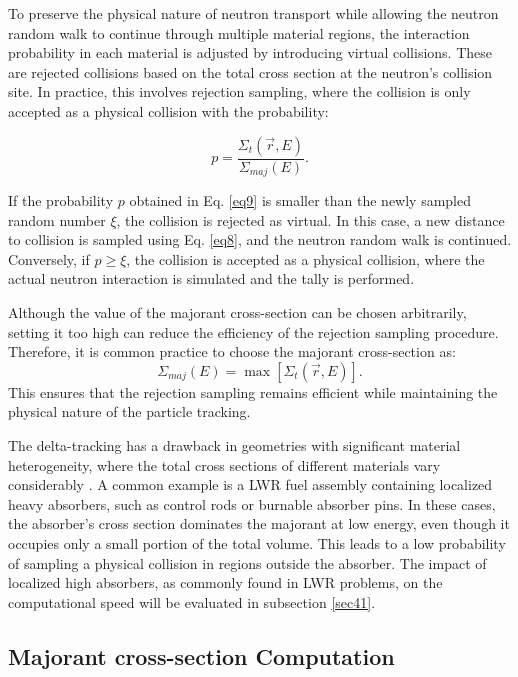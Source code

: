 To preserve the physical nature of neutron transport while allowing the neutron random walk to continue through multiple material regions, the interaction probability in each material is adjusted by introducing virtual collisions. These are rejected collisions based on the total cross section at the neutron's collision site. In practice, this involves rejection sampling, where the collision is only accepted as a physical collision with the probability:

\begin{equation}
    p = \frac{\Sigma_t(\vec{r},E)}{\Sigma_{maj}(E)}.
    \label{eq9}
\end{equation}

If the probability $p$ obtained in Eq. \ref{eq9} is smaller than the newly sampled random number $\xi$, the collision is rejected as virtual. In this case, a new distance to collision is sampled using Eq. \ref{eq8}, and the neutron random walk is continued. Conversely, if $p \geq \xi$, the collision is accepted as a physical collision, where the actual neutron interaction is simulated and the tally is performed.

Although the value of the majorant cross-section can be chosen arbitrarily, setting it too high can reduce the efficiency of the rejection sampling procedure. Therefore, it is common practice to choose the majorant cross-section as:
\begin{equation}
    \Sigma_{maj}(E) = \max{\left[\Sigma_t(\vec{r},E)\right]}.
    \label{eq10}
\end{equation}
This ensures that the rejection sampling remains efficient while maintaining the physical nature of the particle tracking.

The delta-tracking has a drawback in geometries with significant material heterogeneity, where the total cross sections of different materials vary considerably \cite{leppanen_2010}. A common example is a LWR fuel assembly containing localized heavy absorbers, such as control rods or burnable absorber pins. In these cases, the absorber's cross section dominates the majorant at low energy, even though it occupies only a small portion of the total volume. This leads to a low probability of sampling a physical collision in regions outside the absorber. The impact of localized high absorbers, as commonly found in LWR problems, on the computational speed will be evaluated in subsection \ref{sec41}.

\subsection{Majorant cross-section Computation} \label{sec24}

